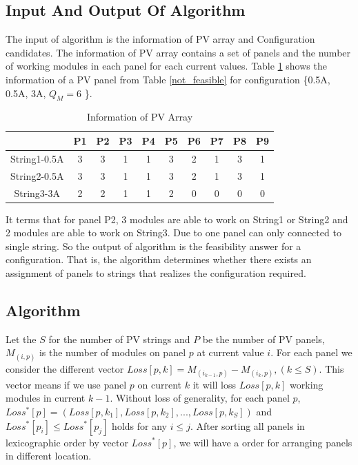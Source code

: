 \documentclass[conference]{IEEEtran}
\begin{document}
\subsection{Input And Output Of Algorithm}\label{Sec5_1}
The input of algorithm is the information of PV array and Configuration candidates. The information of PV array contains a set of panels and the number of working modules in each panel for each current values. Table \ref{Info_Array} shows the information of a PV panel from Table \ref{not_feasible} for configuration \{0.5A, 0.5A, 3A, $Q_M = 6$ \}.
\begin{table}[htbp]
    \caption{Information of PV Array}
    \begin{center}
    \begin{tabular}{c|c|c|c|c|c|c|c|c|c}
    \hline\hline
             & P1 & P2  & P3  & P4 & P5 & P6  & P7  & P8  & P9  \\ \hline
         String1-0.5A & 3& 3 & 1   & 1  & 3& 2  & 1   & 3 & 1 \\ \hline
         String2-0.5A & 3& 3 & 1   & 1  & 3& 2  & 1   & 3 & 1  \\ \hline
         String3-3A   & 2 & 2  & 1   & 1  & 2 & 0  &0   &0  &0  \\\hline \hline
    \end{tabular}
    \label{Info_Array}
    \end{center}
\end{table}
It terms that for panel P2, 3 modules are able to work on String1 or String2 and 2 modules are able to work on String3. Due to one panel can only connected to single string. So the output of algorithm is the feasibility answer for a configuration. That is, the algorithm determines whether there exists an assignment of panels to strings that realizes the configuration required.

\subsection{Algorithm}

Let the $S$ for the number of PV strings and $P$ be the number of PV panels, $M_{(i,p)}$ is the number of modules on panel $p$ at current value $i$. For each panel we consider the different vector $Loss[p,k] = M_{(i_{k-1},p)}-M_{(i_{k},p)} ,(k \leq S)$. This vector means if we use panel $p$ on current $k$  it will loss $Loss[p,k]$ working modules in current $k-1$. Without loss of generality, for each panel $p$, $Loss^*[p] = ( Loss[p,k_1], Loss[p,k_2],..., Loss[p,k_S] )$ and $Loss^*[p_i] \leq Loss^*[p_j]$ holds for any $i \leq j$. After sorting all panels in lexicographic order by vector $Loss^*[p]$, we will have a order for arranging panels in different location.
\end{document}
